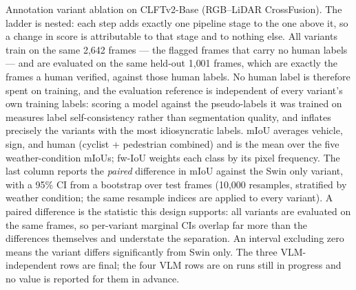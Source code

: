 \begin{table}[t]
\centering
\caption{Annotation variant ablation on CLFTv2-Base (RGB--LiDAR CrossFusion).
         The ladder is nested: each step adds exactly one pipeline stage to the one above it, so a
         change in score is attributable to that stage and to nothing else.
         All variants train on the same 2{,}642 frames --- the flagged frames that carry no human
         labels --- and are evaluated on the same held-out 1{,}001 frames, which are exactly the
         frames a human verified, against those human labels.
         No human label is therefore spent on training, and the evaluation reference is independent
         of every variant's own training labels: scoring a model against the pseudo-labels it was
         trained on measures label self-consistency rather than segmentation quality, and inflates
         precisely the variants with the most idiosyncratic labels.
         mIoU averages vehicle, sign, and human (cyclist + pedestrian combined) and is the mean over
         the five weather-condition mIoUs; fw-IoU weights each class by its pixel frequency.
         The last column reports the \emph{paired} difference in mIoU against the Swin only variant,
         with a 95\% CI from a bootstrap over test frames (10{,}000 resamples, stratified by weather
         condition; the same resample indices are applied to every variant).
         A paired difference is the statistic this design supports: all variants are evaluated on the
         same frames, so per-variant marginal CIs overlap far more than the differences themselves and
         understate the separation.
         An interval excluding zero means the variant differs significantly from Swin only.
         The three VLM-independent rows are final; the four VLM rows are  on runs
         still in progress and no value is reported for them in advance.}
\label{tab:ablation}

\end{table}
